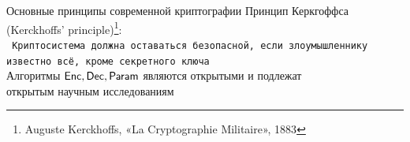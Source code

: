 \documentclass[usenames,dvipsnames,8pt,aspectratio=169]{beamer}
\begin{document}
\begin{frame}{Основные принципы современной криптографии}
\LARGE
		Принцип Керкгоффса (Kerckhoffs’ principle)\footnote{ Auguste Kerckhoffs, «La Cryptographie Militaire», 1883}: \\[10pt]
		
		\texttt{ Криптосистема должна оставаться безопасной, если злоумышленнику известно всё, кроме секретного ключа} \\[30pt]
		
		
		 Алгоритмы $\textsf{Enc}, \textsf{Dec}, \textsf{Param}$ являются открытыми и подлежат \\ открытым научным исследованиям
		
\end{frame}
\end{document}
